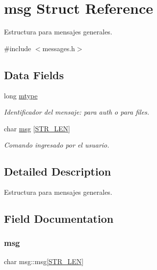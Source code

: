 \hypertarget{structmsg}{}\section{msg Struct Reference}
\label{structmsg}


Estructura para mensajes generales.  




{\ttfamily \#include $<$messages.\+h$>$}

\subsection*{Data Fields}
\begin{DoxyCompactItemize}
\item 
long \hyperlink{structmsg_accdc8131bcf1ef1bcd7df1b337aee50f}{mtype}
\begin{DoxyCompactList}\small\item\em Identificador del mensaje\+: para auth o para files. \end{DoxyCompactList}\item 
char \hyperlink{structmsg_abe6f2182ceadb6b247e562794820be12}{msg} \mbox{[}\hyperlink{sockets_8h_af5b27449abdfc22a937250696492e03f}{S\+T\+R\+\_\+\+L\+EN}\mbox{]}
\begin{DoxyCompactList}\small\item\em Comando ingresado por el usuario. \end{DoxyCompactList}\end{DoxyCompactItemize}


\subsection{Detailed Description}
Estructura para mensajes generales. 



\subsection{Field Documentation}
\mbox{\label{structmsg_abe6f2182ceadb6b247e562794820be12}} 
\subsubsection{\texorpdfstring{msg}{msg}}
{\footnotesize\ttfamily char msg\+::msg\mbox{[}\hyperlink{sockets_8h_af5b27449abdfc22a937250696492e03f}{S\+T\+R\+\_\+\+L\+EN}\mbox{]}}



